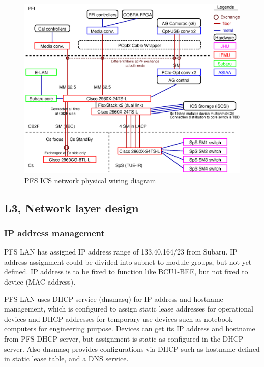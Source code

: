\documentclass[a4paper,notitlepage]{article}
\begin{document}
\begin{figure}[htb]
  \begin{center}
    \includegraphics{pfs_network_physical.eps}
  \end{center}
  \caption{PFS ICS network physical wiring diagram}
  \label{fig:network_physical}
\end{figure}


\subsection{L3, Network layer design}

\subsubsection{IP address management}

PFS LAN has assigned IP address range of 133.40.164/23 from Subaru. 
IP address assignment could be divided into subnet to module groups, but 
not yet defined. IP address is to be fixed to function like BCU1-BEE, but not 
fixed to device (MAC address). 

PFS LAN uses DHCP service (dnsmasq) for IP address and hostname management, 
which is configured to assign static lease addresses for operational devices 
and DHCP addresses for temporary use devices such as notebook computers for 
engineering purpose. Devices can get its IP address and hostname from PFS DHCP 
server, but assignment is static as configured in the DHCP server. Also 
dnsmasq provides configurations via DHCP such as hostname defined in static 
lease table, and a DNS service. 
\end{document}
